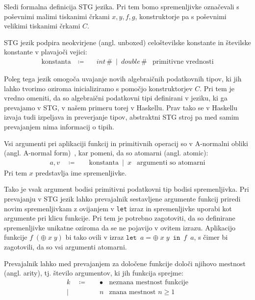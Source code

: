 Sledi formalna definicija STG jezika. Pri tem bomo spremenljivke oz\-na\-če\-va\-li s poševnimi malimi tiskanimi črkami $x, y, f, g$, konstruktorje pa s poševnimi velikimi tiskanimi črkami $C$.

STG jezik podpira neokvirjene (angl. unboxed) celoštevilske konstante in številske konstante v plavajoči vejici:
\begin{align*}
	\text{konstanta} \quad \coloneq& \quad int \, \texttt{\#} \enspace \vert \enspace double \, \texttt{\#} & \text{primitivne vrednosti}
\end{align*}

Poleg tega jezik omogoča uvajanje novih algebraičnih podatkovnih tipov, ki jih lahko tvorimo oziroma inicializiramo s pomočjo konstruktorjev $C$. Pri tem je vredno omeniti, da so algebraični podatkovni tipi definirani v jeziku, ki ga prevajamo v STG, v našem primeru torej v Haskellu. Prav tako se v Haskellu izvaja tudi izpeljava in preverjanje tipov, abstraktni STG stroj pa med samim prevajanjem nima informacij o tipih.

Vsi argumenti pri aplikaciji funkcij in primitivnih operacij so v A-normalni obliki (angl. A-normal form)~\cite{flanagan1993essence}, kar pomeni, da so atomarni (angl. atomic):
\begin{align*}
	a, v \quad \coloneq& \quad \text{konstanta} \enspace \vert \enspace x & \text{argumenti so atomarni}
\end{align*}
Pri tem $x$ predstavlja ime spremenljivke.

Tako je vsak argument bodisi primitivni podatkovni tip bodisi spremenljivka. Pri prevajanju v STG jezik lahko prevajalnik sestavljene argumente funkcij priredi novim spremenljivkam z ovijanjem v \texttt{let} izraz in spremenljivke uporabi kot argumente pri klicu funkcije. Pri tem je potrebno zagotoviti, da so definirane spremenljivke unikatne oziroma da se ne pojavijo v ovitem izrazu. Aplikacijo funkcije $f \; (\oplus \; x \; y)$ bi tako ovili v  izraz $\texttt{let} \enspace a = \oplus \; x \; y \enspace \texttt{in} \enspace f \enspace a$, s čimer bi zagotovili, da so vsi argumenti atomarni.

Prevajalnik lahko med prevajanjem za določene funkcije določi njihovo mestnost (angl. arity), tj. število argumentov, ki jih funkcija sprejme:
\begin{align*}
	k \quad \coloneq& \quad \bullet & \text{neznana mestnost funkcije}\\
	\vert& \quad n & \text{znana mestnost $n \geq 1$}
\end{align*}

